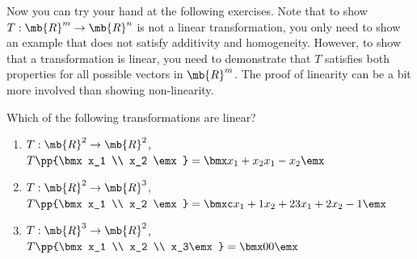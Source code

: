 Now you can try your hand at the following exercises. Note that to show $T: \mb{R}^m \to \mb{R}^n$ is not a linear transformation, you only need to show an example that does not satisfy additivity and homogeneity. However, to show that a transformation is linear, you need to demonstrate that $T$ satisfies both properties for all possible vectors in $\mb{R}^m$. The proof of linearity can be a bit more involved than showing non-linearity.
\begin{boxedstuff}
\begin{problem}
Which of the following transformations are linear?
\begin{enumerate}
    \item $T: \mb{R}^2 \to \mb{R}^2$, $T\pp{\bmx x_1 \\ x_2 \emx} = \bmx x_1 + x_2 \\ x_1 - x_2 \emx$
    \item $T: \mb{R}^2 \to \mb{R}^3$, $T\pp{\bmx x_1 \\ x_2 \emx} = \bmxc x_1 + 1 \\ x_2 + 2 \\ 3x_1 + 2x_2 - 1\emx$
    \item $T: \mb{R}^3 \to \mb{R}^2$, $T\pp{\bmx x_1 \\ x_2 \\ x_3\emx} = \bmx 0 \\ 0 \emx$
\end{enumerate}
\end{problem}
\end{boxedstuff}

